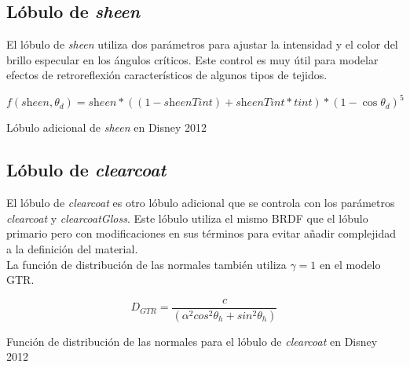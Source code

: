             \subsection*{L\'obulo de \textit{sheen}}
                El l\'obulo de \textit{sheen} utiliza dos par\'ametros para ajustar la intensidad y el color del brillo especular
                en los \'angulos cr\'iticos. Este control es muy \'util para modelar efectos de retroreflexi\'on caracter\'isticos
                de algunos tipos de tejidos.
            
                \begin{eqfloat}[!htb]
                \begin{equation}
                    f(\textit{sheen}, \theta_d) = \textit{sheen} * ((1 - \textit{sheenTint}) + \textit{sheenTint} * \textit{tint}) * (1 - \cos\theta_d)^5
                \end{equation}
                \caption{L\'obulo adicional de \textit{sheen} en Disney 2012}
                \end{eqfloat}
                \singlespacing

            \subsection*{L\'obulo de \textit{clearcoat}}
                El l\'obulo de \textit{clearcoat} es otro l\'obulo adicional que se controla con los par\'ametros \textit{clearcoat}
                y \textit{clearcoatGloss}. Este l\'obulo utiliza el mismo BRDF que el l\'obulo primario pero con modificaciones
                en sus t\'erminos para evitar a\~nadir complejidad a la definici\'on del material.\\

                La funci\'on de distribuci\'on de las normales tambi\'en utiliza $\gamma = 1$ en el modelo GTR.\\

                \begin{eqfloat}[!htb]
                    \begin{equation}
                    D_{GTR} = \frac
                    {c}
                    {(\alpha^2 cos^2 \theta_h + sin^2 \theta_h)}
                    \end{equation}
                    \caption{Funci\'on de distribuci\'on de las normales para el l\'obulo de \textit{clearcoat} en Disney 2012}
                \end{eqfloat}
                \singlespacing

